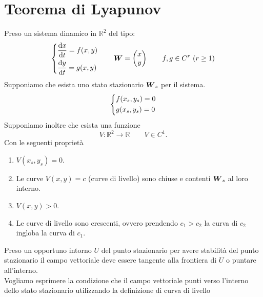 \section{Teorema di Lyapunov}%
\label{sub:Teorema di Lyapunov}
Preso un sistema dinamico in $\mathbb{R}^2$ del tipo:
\[
\begin{dcases}
    \frac{\text{d} x}{\text{d} t} = f(x, y) \\
    \frac{\text{d} y}{\text{d} t} = g(x, y) 
\end{dcases}
\qquad
\boldsymbol{W}= \begin{pmatrix} x \\ y \end{pmatrix}
\qquad
f,g \in C^r \ (r\ge 1) 
\]
Supponiamo che esista uno stato stazionario $\boldsymbol{W}_s$ per il sistema.
\[
\begin{dcases}
    f(x_s, y_s) =0\\
    g(x_s, y_s) =0
\end{dcases}
\]
Supponiamo inoltre che esista una funzione 
\[
    V:\mathbb{R}^2\to \mathbb{R} \qquad  V \in C^1
.\] 
Con le seguenti proprietà

\begin{enumerate}
    \item $V(x_s, y_s) =0$.
    \item Le curve $V(x, y) = c$ (curve di livello) sono chiuse e contenti $\boldsymbol{W}_s$ al loro interno.
    \item $V(x, y) >0$.
    \item Le curve di livello sono crescenti, ovvero prendendo $c_1 > c_2$ la curva di $c_2$ ingloba la curva di $c_1$.
\end{enumerate}
Preso un opportuno intorno $U$ del punto stazionario per avere stabilità del punto stazionario il campo vettoriale deve essere tangente alla frontiera di $U$ o puntare all'interno.
\noindent\\
Vogliamo esprimere la condizione che il campo vettoriale punti verso l'interno dello stato stazionario utilizzando la definizione di curva di livello

